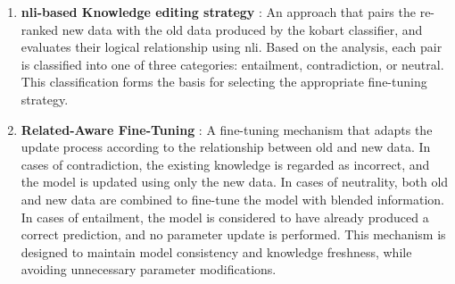 \documentclass[a4paper,fleqn]{cas-sc}
\begin{document}
\begin{enumerate}
    \item\textbf{\gls{nli}-based Knowledge editing strategy} : 
    An approach that pairs the re-ranked new data with the old data produced by the \gls{kobart} classifier, and evaluates their logical relationship using \gls{nli}. Based on the analysis, each pair is classified into one of three categories: entailment, contradiction, or neutral. This classification forms the basis for selecting the appropriate fine-tuning strategy.
    \item\textbf{Related-Aware Fine-Tuning} : 
    A fine-tuning mechanism that adapts the update process according to the relationship between old and new data.
    In cases of contradiction, the existing knowledge is regarded as incorrect, and the model is updated using only the new data.
    In cases of neutrality, both old and new data are combined to fine-tune the model with blended information.
    In cases of entailment, the model is considered to have already produced a correct prediction, and no parameter update is performed.
    This mechanism is designed to maintain model consistency and knowledge freshness, while avoiding unnecessary parameter modifications.
\end{enumerate}
\end{document}
